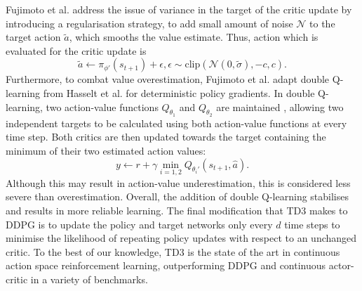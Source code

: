 Fujimoto et al. \cite{Fujimoto2018} address the issue of variance in the target of the critic update by introducing a regularisation strategy, to add small amount of noise $\mathcal{N}$ to the target action $\tilde{a}$, which smooths the value estimate.
Thus, action which is evaluated for the critic update is
\begin{equation}
    \tilde{a} \leftarrow \pi_{\phi'}(s_{t+1}) + \epsilon, \epsilon \sim \text{clip}(\mathcal{N}(0,\tilde{\sigma}), -c,c).
\end{equation}
Furthermore, to combat value overestimation, Fujimoto et al. \cite{Fujimoto2018} adapt double Q-learning from Hasselt et al. \cite{hasselt2015} for deterministic policy gradients. 
In double Q-learning, two action-value functions $Q_{\theta_1}$ and $Q_{\theta_2}$ are maintained
, allowing two independent targets to be calculated using both action-value functions at every time step.
Both critics are then updated towards the target containing the minimum of their two estimated action values:
\begin{equation}
    y \leftarrow r + \gamma \min_{i=1,2} Q_{\theta_i'}(s_{t+1}, \hat{a}).
\end{equation}
Although this may result in action-value underestimation, this is considered less severe than overestimation.
Overall, the addition of double Q-learning stabilises and results in more reliable learning.
The final modification that TD3 makes to DDPG is to update the policy and target networks only every $d$ time steps to minimise the likelihood of repeating policy  updates with respect to an unchanged critic.
To the best of our knowledge, TD3 is the state of the art in continuous action space reinforcement learning, outperforming DDPG and continuous actor-critic in a variety of benchmarks.

